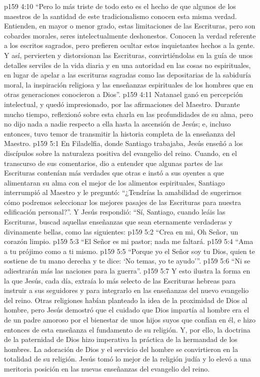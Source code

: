 \vs p159 4:10 “Pero lo más triste de todo esto es el hecho de que algunos de los maestros de la santidad de este tradicionalismo conocen esta misma verdad. Entienden, en mayor o menor grado, estas limitaciones de las Escrituras, pero son cobardes morales, seres intelectualmente deshonestos. Conocen la verdad referente a los escritos sagrados, pero prefieren ocultar estos inquietantes hechos a la gente. Y así, pervierten y distorsionan las Escrituras, convirtiéndolas en la guía de unos detalles serviles de la vida diaria y en una autoridad en las cosas no espirituales, en lugar de apelar a las escrituras sagradas como las depositarias de la sabiduría moral, la inspiración religiosa y las enseñanzas espirituales de los hombres que en otras generaciones conocieron a Dios”.
\vs p159 4:11 \pc Natanael ganó en percepción intelectual, y quedó impresionado, por las afirmaciones del Maestro. Durante mucho tiempo, reflexionó sobre esta charla en las profundidades de su alma, pero no dijo nada a nadie respecto a ella hasta la ascensión de Jesús; e, incluso entonces, tuvo temor de transmitir la historia completa de la enseñanza del Maestro.
\vs p159 5:1 En Filadelfia, donde Santiago trabajaba, Jesús enseñó a los discípulos sobre la naturaleza positiva del evangelio del reino. Cuando, en el transcurso de sus comentarios, dio a entender que algunas partes de las Escrituras contenían más verdades que otras e instó a sus oyentes a que alimentaran su alma con el mejor de los alimentos espirituales, Santiago interrumpió al Maestro y le preguntó: “¿Tendrías la amabilidad de sugerirnos cómo podremos seleccionar los mejores pasajes de las Escrituras para nuestra edificación personal?”. Y Jesús respondió: “Sí, Santiago, cuando leáis las Escrituras, buscad aquellas enseñanzas que sean eternamente verdaderas y divinamente bellas, como las siguientes:
\vs p159 5:2 “Crea en mi, Oh Señor, un corazón limpio.
\vs p159 5:3 \pc “El Señor es mi pastor; nada me faltará.
\vs p159 5:4 \pc “Ama a tu prójimo como a ti mismo.
\vs p159 5:5 \pc “Porque yo el Señor soy tu Dios, quien te sostiene de tu mano derecha y te dice: ‘No temas, yo te ayudo’”.
\vs p159 5:6 \pc “Ni se adiestrarán más las naciones para la guerra”.
\vs p159 5:7 \pc Y esto ilustra la forma en la que Jesús, cada día, extraía lo más selecto de las Escrituras hebreas para instruir a sus seguidores y para integrarlo en las enseñanzas del nuevo evangelio del reino. Otras religiones habían planteado la idea de la proximidad de Dios al hombre, pero Jesús demostró que el cuidado que Dios impartía al hombre era el de un padre amoroso por el bienestar de unos hijos suyos que confían en él, e hizo entonces de esta enseñanza el fundamento de su religión. Y, por ello, la doctrina de la paternidad de Dios hizo imperativa la práctica de la hermandad de los hombres. La adoración de Dios y el servicio del hombre se convirtieron en la totalidad de su religión. Jesús tomó lo mejor de la religión judía y lo elevó a una meritoria posición en las nuevas enseñanzas del evangelio del reino.
